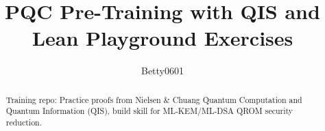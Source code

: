 \documentclass{iacrtrans}
\title{PQC Pre-Training with QIS and Lean Playground Exercises}
\author{Betty0601}
\institute{Training project repository}
\begin{document}
\maketitle

\begin{abstract}
Training repo: Practice proofs from Nielsen \& Chuang Quantum Computation and Quantum Information (QIS), build skill for ML-KEM/ML-DSA QROM security reduction.
\end{abstract}







\end{document}
